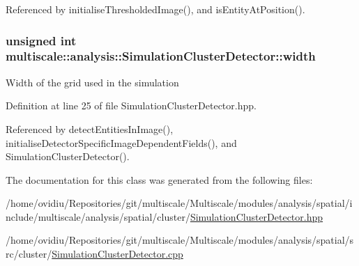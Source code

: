Referenced by initialise\-Thresholded\-Image(), and is\-Entity\-At\-Position().

\hypertarget{classmultiscale_1_1analysis_1_1SimulationClusterDetector_a4c66a82aa1749dce31c767bc4008d904}{
\subsubsection[{width}]{\setlength{\rightskip}{0pt plus 5cm}unsigned int multiscale\-::analysis\-::\-Simulation\-Cluster\-Detector\-::width\hspace{0.3cm}{\ttfamily [private]}}}\label{classmultiscale_1_1analysis_1_1SimulationClusterDetector_a4c66a82aa1749dce31c767bc4008d904}
Width of the grid used in the simulation 

Definition at line 25 of file Simulation\-Cluster\-Detector.\-hpp.



Referenced by detect\-Entities\-In\-Image(), initialise\-Detector\-Specific\-Image\-Dependent\-Fields(), and Simulation\-Cluster\-Detector().



The documentation for this class was generated from the following files\-:\begin{DoxyCompactItemize}
\item 
/home/ovidiu/\-Repositories/git/multiscale/\-Multiscale/modules/analysis/spatial/include/multiscale/analysis/spatial/cluster/\hyperlink{SimulationClusterDetector_8hpp}{Simulation\-Cluster\-Detector.\-hpp}\item 
/home/ovidiu/\-Repositories/git/multiscale/\-Multiscale/modules/analysis/spatial/src/cluster/\hyperlink{SimulationClusterDetector_8cpp}{Simulation\-Cluster\-Detector.\-cpp}\end{DoxyCompactItemize}
